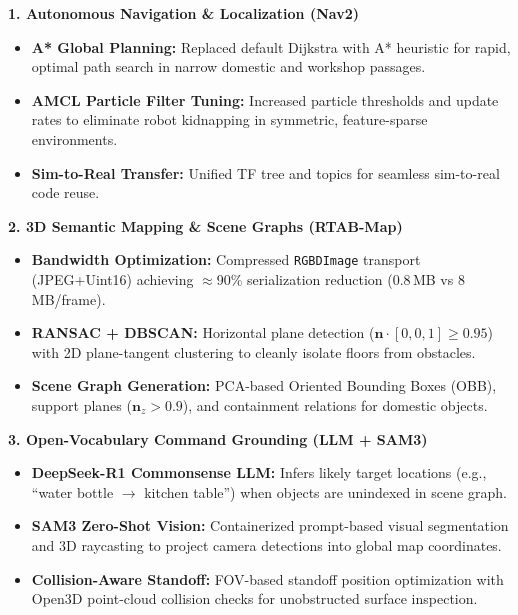 \documentclass[8pt,a4paper]{article}
\newcommand{\kitem}[2]{{\fontsize{6.8}{7.8}\selectfont\textbf{\color{steelBlue}#1:} #2}}
\newcommand{\secsubhead}[1]{{\fontsize{7.2}{8.2}\selectfont\textbf{\color{navyDark}#1}}}
\begin{document}
\begin{minipage}[t]{0.495\textwidth}

    \begin{tcolorbox}[title={Autonomy, Perception \& Reasoning Stack}]
        \secsubhead{1. Autonomous Navigation \& Localization (Nav2)}
        \begin{itemize}
            \item \kitem{A* Global Planning}{Replaced default Dijkstra with A* heuristic for rapid, optimal path search in narrow domestic and workshop passages.}
            \item \kitem{AMCL Particle Filter Tuning}{Increased particle thresholds and update rates to eliminate robot kidnapping in symmetric, feature-sparse environments.}
            \item \kitem{Sim-to-Real Transfer}{Unified TF tree and topics for seamless sim-to-real code reuse.}
        \end{itemize}
        \vspace{2pt}

        \secsubhead{2. 3D Semantic Mapping \& Scene Graphs (RTAB-Map)}
        \begin{itemize}
            \item \kitem{Bandwidth Optimization}{Compressed \texttt{RGBDImage} transport (JPEG+Uint16) achieving $\approx$90\% serialization reduction (0.8\,MB vs 8\,MB/frame).}
            \item \kitem{RANSAC + DBSCAN}{Horizontal plane detection ($\mathbf{n}\cdot[0,0,1]\ge0.95$) with 2D plane-tangent clustering to cleanly isolate floors from obstacles.}
            \item \kitem{Scene Graph Generation}{PCA-based Oriented Bounding Boxes (OBB), support planes ($\mathbf{n}_z>0.9$), and containment relations for domestic objects.}
        \end{itemize}
        \vspace{2pt}

        \secsubhead{3. Open-Vocabulary Command Grounding (LLM + SAM3)}
        \begin{itemize}
            \item \kitem{DeepSeek-R1 Commonsense LLM}{Infers likely target locations (e.g., ``water bottle $\to$ kitchen table'') when objects are unindexed in scene graph.}
            \item \kitem{SAM3 Zero-Shot Vision}{Containerized prompt-based visual segmentation and 3D raycasting to project camera detections into global map coordinates.}
            \item \kitem{Collision-Aware Standoff}{FOV-based standoff position optimization with Open3D point-cloud collision checks for unobstructed surface inspection.}
        \end{itemize}
    \end{tcolorbox}


\end{minipage}
\end{document}
